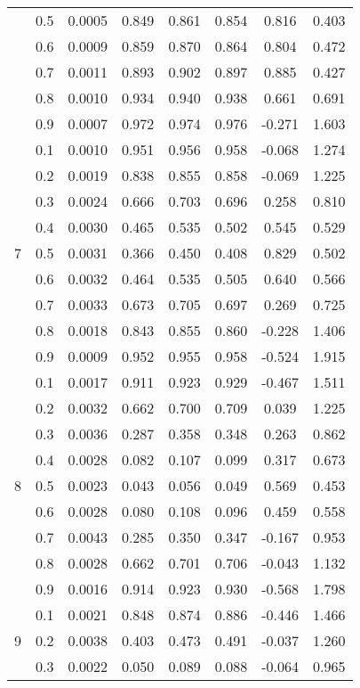 \documentclass[11pt,a4paper]{report}
\begin{document}
\begin{longtable}{ | c | c || c | c | c | c | c | c | }
 & 0.5 & 0.0005 & 0.849 & 0.861 & 0.854 & 0.816 & 0.403 \\
 & 0.6 & 0.0009 & 0.859 & 0.870 & 0.864 & 0.804 & 0.472 \\
 & 0.7 & 0.0011 & 0.893 & 0.902 & 0.897 & 0.885 & 0.427 \\
 & 0.8 & 0.0010 & 0.934 & 0.940 & 0.938 & 0.661 & 0.691 \\
 & 0.9 & 0.0007 & 0.972 & 0.974 & 0.976 & -0.271 & 1.603 \\
 \hline
\multirow{9}{*}{7} & 0.1 & 0.0010 & 0.951 & 0.956 & 0.958 & -0.068 & 1.274 \\
 & 0.2 & 0.0019 & 0.838 & 0.855 & 0.858 & -0.069 & 1.225 \\
 & 0.3 & 0.0024 & 0.666 & 0.703 & 0.696 & 0.258 & 0.810 \\
 & 0.4 & 0.0030 & 0.465 & 0.535 & 0.502 & 0.545 & 0.529 \\
 & 0.5 & 0.0031 & 0.366 & 0.450 & 0.408 & 0.829 & 0.502 \\
 & 0.6 & 0.0032 & 0.464 & 0.535 & 0.505 & 0.640 & 0.566 \\
 & 0.7 & 0.0033 & 0.673 & 0.705 & 0.697 & 0.269 & 0.725 \\
 & 0.8 & 0.0018 & 0.843 & 0.855 & 0.860 & -0.228 & 1.406 \\
 & 0.9 & 0.0009 & 0.952 & 0.955 & 0.958 & -0.524 & 1.915 \\
 \hline
\multirow{9}{*}{8} & 0.1 & 0.0017 & 0.911 & 0.923 & 0.929 & -0.467 & 1.511 \\
 & 0.2 & 0.0032 & 0.662 & 0.700 & 0.709 & 0.039 & 1.225 \\
 & 0.3 & 0.0036 & 0.287 & 0.358 & 0.348 & 0.263 & 0.862 \\
 & 0.4 & 0.0028 & 0.082 & 0.107 & 0.099 & 0.317 & 0.673 \\
 & 0.5 & 0.0023 & 0.043 & 0.056 & 0.049 & 0.569 & 0.453 \\
 & 0.6 & 0.0028 & 0.080 & 0.108 & 0.096 & 0.459 & 0.558 \\
 & 0.7 & 0.0043 & 0.285 & 0.350 & 0.347 & -0.167 & 0.953 \\
 & 0.8 & 0.0028 & 0.662 & 0.701 & 0.706 & -0.043 & 1.132 \\
 & 0.9 & 0.0016 & 0.914 & 0.923 & 0.930 & -0.568 & 1.798 \\
 \hline
\multirow{9}{*}{9} & 0.1 & 0.0021 & 0.848 & 0.874 & 0.886 & -0.446 & 1.466 \\
 & 0.2 & 0.0038 & 0.403 & 0.473 & 0.491 & -0.037 & 1.260 \\
 & 0.3 & 0.0022 & 0.050 & 0.089 & 0.088 & -0.064 & 0.965 \\

\end{longtable}
\end{document}
